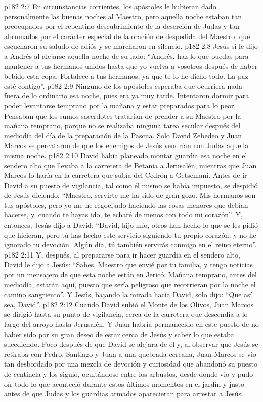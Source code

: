 \vs p182 2:7 \pc En circunstancias corrientes, los apóstoles le hubieran dado personalmente las buenas noches al Maestro, pero aquella noche estaban tan preocupados por el repentino descubrimiento de la deserción de Judas y tan abrumados por el carácter especial de la oración de despedida del Maestro, que escucharon su saludo de adiós y se marcharon en silencio.
\vs p182 2:8 Jesús sí le dijo a Andrés al alejarse aquella noche de su lado: “Andrés, haz lo que puedas para mantener a tus hermanos unidos hasta que yo vuelva a vosotros después de haber bebido esta copa. Fortalece a tus hermanos, ya que te lo he dicho todo. La paz esté contigo”.
\vs p182 2:9 Ninguno de los apóstoles esperaba que ocurriera nada fuera de lo ordinario esa noche, pues era ya muy tarde. Intentaron dormir para poder levantarse temprano por la mañana y estar preparados para lo peor. Pensaban que los sumos sacerdotes tratarían de prender a su Maestro por la mañana temprano, porque no se realizaba ninguna tarea secular después del mediodía del día de la preparación de la Pascua. Solo David Zebedeo y Juan Marcos se percataron de que los enemigos de Jesús vendrían con Judas aquella misma noche.
\vs p182 2:10 \pc David había planeado montar guardia esa noche en el sendero alto que llevaba a la carretera de Betania a Jerusalén, mientras que Juan Marcos lo haría en la carretera que subía del Cedrón a Getsemaní. Antes de ir David a su puesto de vigilancia, tal como él mismo se había impuesto, se despidió de Jesús diciendo: “Maestro, servirte me ha sido de gran gozo. Mis hermanos son tus apóstoles, pero yo me he regocijado haciendo las cosas menores que debían hacerse, y, cuando te hayas ido, te echaré de menos con todo mi corazón”. Y, entonces, Jesús dijo a David: “David, hijo mío, otros han hecho lo que se les pidió que hicieran, pero tú has hecho este servicio siguiendo tu propio corazón, y no he ignorado tu devoción. Algún día, tú también servirás conmigo en el reino eterno”.
\vs p182 2:11 Y, después, al prepararse para ir hacer guardia en el sendero alto, David le dijo a Jesús: “Sabes, Maestro que envié por tu familia, y tengo noticias por un mensajero de que esta noche están en Jericó. Mañana temprano, antes del mediodía, estarán aquí, puesto que sería peligroso que recorrieran por la noche el camino sangriento”. Y Jesús, bajando la mirada hacia David, solo dijo: “Que así sea, David”.
\vs p182 2:12 \pc Cuando David subió el Monte de los Olivos, Juan Marcos se dirigió hasta su punto de vigilancia, cerca de la carretera que descendía a lo largo del arroyo hasta Jerusalén. Y Juan habría permanecido en este puesto de no haber sido por su gran deseo de estar cerca de Jesús y saber lo que estaba sucediendo. Poco después de que David se alejara de él y, al observar que Jesús se retiraba con Pedro, Santiago y Juan a una quebrada cercana, Juan Marcos se vio tan desbordado por una mezcla de devoción y curiosidad que abandonó su puesto de centinela y los siguió, ocultándose entre los arbustos, desde donde vio y pudo oír todo lo que aconteció durante estos últimos momentos en el jardín y justo antes de que Judas y los guardias armados aparecieran para arrestar a Jesús.
